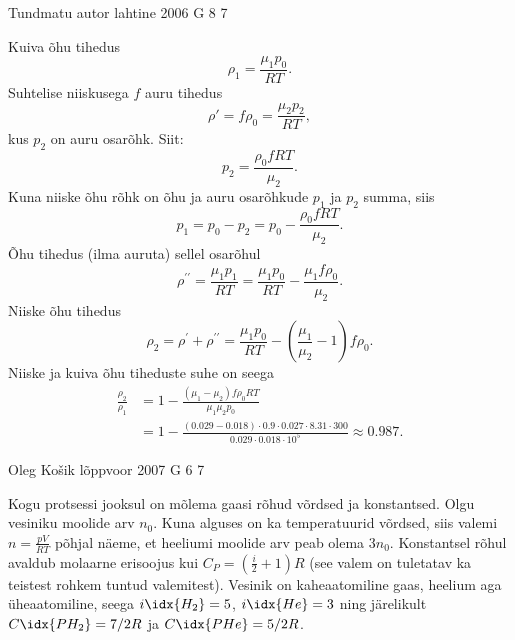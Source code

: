\documentclass[11pt]{article}
\begin{document}
{%
{Tundmatu autor} %
{lahtine} %
{2006} %
{G 8} %
{7} %
{

\ifSolution
Kuiva õhu tihedus
\[
\rho_1 = \frac{\mu_1p_0}{RT}.
\]
Suhtelise niiskusega $f$ auru tihedus
\[
\rho' = f \rho_0 = \frac{\mu_2p_2}{RT},
\]
kus $p_2$ on auru osarõhk. Siit:
\[
p_2 = \frac{\rho_0fRT}{\mu_2}.
\]
Kuna niiske õhu rõhk on õhu ja auru osarõhkude $p_1$ ja $p_2$ summa, siis
\[
p_1 = p_0 - p_2 = p_0 - \frac{\rho_0fRT}{\mu_2}.
\]
Õhu tihedus (ilma auruta) sellel osarõhul
\[
\rho^{\prime \prime}=\frac{\mu_{1} p_{1}}{R T}=\frac{\mu_{1} p_{0}}{R T}-\frac{\mu_{1} f \rho_{0}}{\mu_{2}}.
\]
Niiske õhu tihedus
\[
\rho_{2}=\rho^{\prime}+\rho^{\prime \prime}=\frac{\mu_{1} p_{0}}{R T}-\left(\frac{\mu_{1}}{\mu_{2}}-1\right) f \rho_{0}.
\]
Niiske ja kuiva õhu tiheduste suhe on seega
\[
\begin{aligned}
\frac{\rho_{2}}{\rho_{1}}&=1-\frac{\left(\mu_{1}-\mu_{2}\right) f \rho_{0} R T}{\mu_{1} \mu_{2} p_{0}} \\ 
&=1-\frac{(\num{0,029}-\num{0,018}) \cdot \num{0,9} \cdot \num{0,027} \cdot \num{8,31} \cdot 300}{\num{0,029} \cdot \num{0,018} \cdot 10^{5}} \approx \num{0,987}.
\end{aligned}
\]
\fi
}

{Oleg Košik} %
{lõppvoor} %
{2007} %
{G 6} %
{7} %
{

\ifSolution
Kogu protsessi jooksul on mõlema gaasi rõhud võrdsed ja konstantsed. Olgu vesiniku moolide arv $n_0$. Kuna alguses on ka temperatuurid võrdsed, siis valemi $n = \frac{pV}{RT}$ põhjal näeme, et heeliumi moolide arv peab olema $3n_0$. Konstantsel rõhul avaldub molaarne erisoojus kui $C_P = \left(\frac{i}{2} + 1\right) R$ (see valem on tuletatav ka teistest rohkem tuntud valemitest). Vesinik on kaheaatomiline gaas, heelium aga üheaatomiline, seega $i\idx{H_2} = 5$, $i\idx{He} = 3$ ning järelikult $C\idx{PH_2} = 7/2R$ ja $C\idx{PHe} = 5/2R$.

}}
\end{document}

